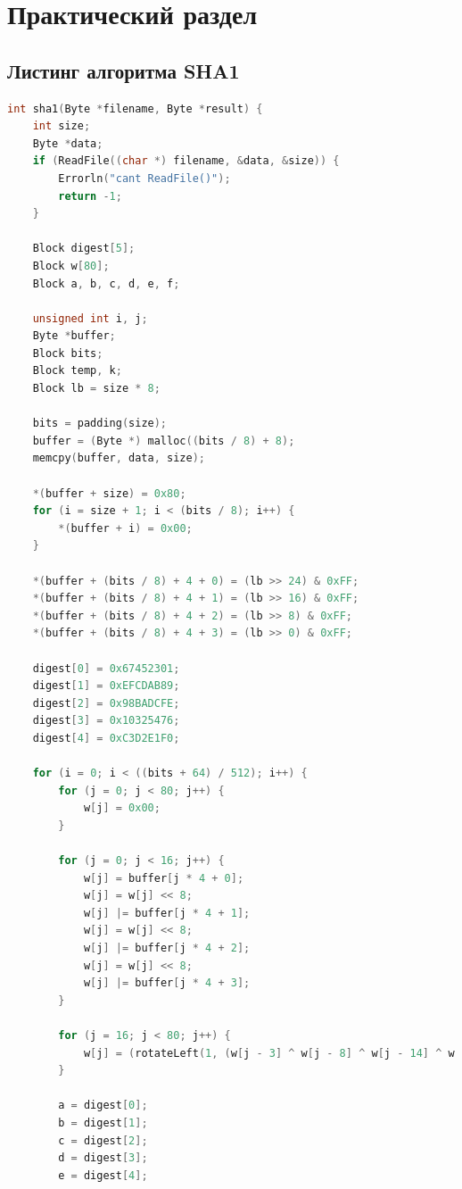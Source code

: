 \chapter{Практический раздел}

\section{Листинг алгоритма SHA1}

\begin{lstlisting}[language=C, label=lst:sha1, caption={Реализация алгоритма SHA1}]
int sha1(Byte *filename, Byte *result) {
    int size;
    Byte *data;
    if (ReadFile((char *) filename, &data, &size)) {
        Errorln("cant ReadFile()");
        return -1;
    }

    Block digest[5];
    Block w[80];
    Block a, b, c, d, e, f;

    unsigned int i, j;
    Byte *buffer;
    Block bits;
    Block temp, k;
    Block lb = size * 8;

    bits = padding(size);
    buffer = (Byte *) malloc((bits / 8) + 8);
    memcpy(buffer, data, size);

    *(buffer + size) = 0x80;
    for (i = size + 1; i < (bits / 8); i++) {
        *(buffer + i) = 0x00;
    }

    *(buffer + (bits / 8) + 4 + 0) = (lb >> 24) & 0xFF;
    *(buffer + (bits / 8) + 4 + 1) = (lb >> 16) & 0xFF;
    *(buffer + (bits / 8) + 4 + 2) = (lb >> 8) & 0xFF;
    *(buffer + (bits / 8) + 4 + 3) = (lb >> 0) & 0xFF;

    digest[0] = 0x67452301;
    digest[1] = 0xEFCDAB89;
    digest[2] = 0x98BADCFE;
    digest[3] = 0x10325476;
    digest[4] = 0xC3D2E1F0;

    for (i = 0; i < ((bits + 64) / 512); i++) {
        for (j = 0; j < 80; j++) {
            w[j] = 0x00;
        }

        for (j = 0; j < 16; j++) {
            w[j] = buffer[j * 4 + 0];
            w[j] = w[j] << 8;
            w[j] |= buffer[j * 4 + 1];
            w[j] = w[j] << 8;
            w[j] |= buffer[j * 4 + 2];
            w[j] = w[j] << 8;
            w[j] |= buffer[j * 4 + 3];
        }

        for (j = 16; j < 80; j++) {
            w[j] = (rotateLeft(1, (w[j - 3] ^ w[j - 8] ^ w[j - 14] ^ w[j - 16])));
        }

        a = digest[0];
        b = digest[1];
        c = digest[2];
        d = digest[3];
        e = digest[4];


\end{lstlisting}
